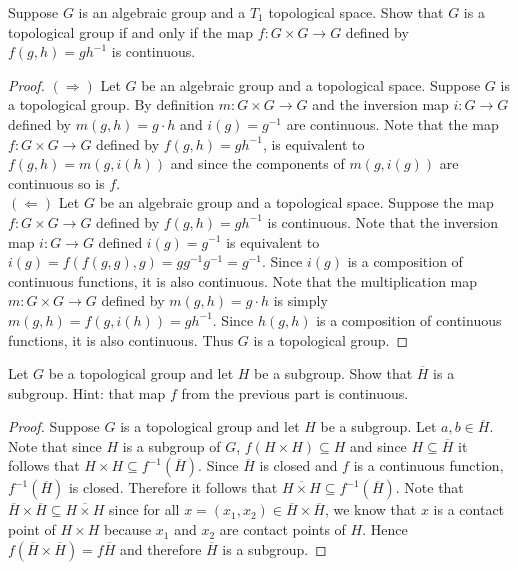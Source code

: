 \documentclass{homework651}
\def\ra{\rightarrow}
\begin{document}
\begin{problems}
\begin{subproblems}
\item
Suppose $G$ is an algebraic group and a $T_1$ topological space.  Show that $G$ is a 
topological group if and only if the map $f:G\times G\ra G$ defined by $f(g,h)=g h^{-1}$
is continuous.
\begin{proof} $(\Rightarrow)$ Let $G$ be an algebraic group and a topological space. Suppose $G$
    is a topological group. By definition $m:G\times G\ra G$ and the inversion map $i:G\ra G$ defined by $m(g,h)=g\cdot h$ and $i(g)=g^{-1}$
    are continuous. Note that the map $f:G\times G\ra G$ defined by $f(g,h)=g h^{-1}$, is equivalent to $f(g, h) = m(g, i(h))$ and since 
    the components of $m(g, i(g))$ are continuous so is $f$.\\



    $(\Leftarrow)$ Let $G$ be an algebraic group and a topological space. Suppose the map $f:G\times G\ra G$ defined by $f(g,h)=g h^{-1}$
    is continuous. Note that the inversion map $i:G\ra G$ defined $i(g)=g^{-1}$ is equivalent to $i(g) = f(f(g,g), g) = gg^{-1}g^{-1} = g^{-1}$.
    Since $i(g)$ is a composition of continuous functions, it is also continuous. Note that the multiplication
    map $m:G\times G\ra G$ defined by $m(g,h)=g\cdot h$ is simply $m(g, h) = f(g, i(h)) = gh^{-1}$. Since $h(g, h)$ is a composition of continuous functions, it is also continuous.
    Thus $G$ is a topological group. 
\end{proof}




\item Let $G$ be a topological group and let $H$ be a subgroup.  Show that $\overline H$ is
a subgroup.  Hint: that map $f$ from the previous part is continuous. 
\begin{proof} Suppose $G$ is a topological group and let $H$ be a subgroup. 
    Let $a, b\in \overline{H}$. Note that since $H$ is a subgroup of $G$, $f(H \times H) \subseteq H$ and since $H \subseteq \overline{H}$ it follows that 
    $H \times H \subseteq f^{-1}(\overline{H})$. Since $\overline{H}$ is closed and $f$ is a continuous function, $f^{-1}(\overline{H})$ is closed. Therefore 
    it follows that $\overline{H \times H} \subseteq f^{-1}(\overline{H})$. Note that $\overline{H} \times \overline{H} \subseteq \overline{H \times H}$ since 
    for all $x = (x_1, x_2) \in \overline{H} \times \overline{H}$, we know that $x$ is a contact point of $H \times H$ because $x_1$ and $x_2$ are contact points of $H$. Hence $f(\overline{H} \times \overline{H}) = f\overline{H}$ and therefore $\overline{H}$ is a subgroup. 


\end{proof}
\end{subproblems}
\end{problems}
\end{document}
